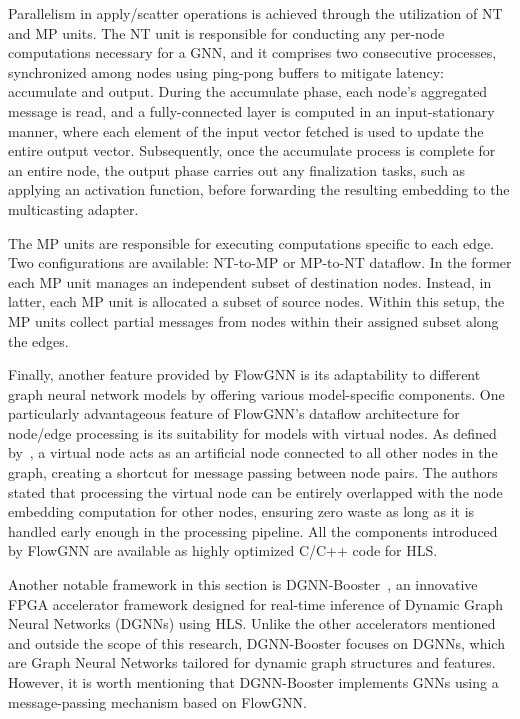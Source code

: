 Parallelism in apply/scatter operations is achieved through the utilization of NT and MP units.
The NT unit is responsible for conducting any per-node computations necessary for a GNN, and it comprises two consecutive processes, synchronized among nodes using ping-pong buffers to mitigate latency: accumulate and output.
During the accumulate phase, each node's aggregated message is read, and a fully-connected layer is computed in an input-stationary manner, where each element of the input vector fetched is used to update the entire output vector.
Subsequently, once the accumulate process is complete for an entire node, the output phase carries out any finalization tasks, such as applying an activation function, before forwarding the resulting embedding to the multicasting adapter.

The MP units are responsible for executing computations specific to each edge.
Two configurations are available: NT-to-MP or MP-to-NT dataflow.
In the former each MP unit manages an independent subset of destination nodes.
Instead, in latter, each MP unit is allocated a subset of source nodes.
Within this setup, the MP units collect partial messages from nodes within their assigned subset along the edges.

Finally, another feature provided by FlowGNN is its adaptability to different graph neural network models by offering various model-specific components.
One particularly advantageous feature of FlowGNN's dataflow architecture for node/edge processing is its suitability for models with virtual nodes.
As defined by~\cite{DBLP:journals/corr/GilmerSRVD17}, a virtual node acts as an artificial node connected to all other nodes in the graph, creating a shortcut for message passing between node pairs.
The authors stated that processing the virtual node can be entirely overlapped with the node embedding computation for other nodes, ensuring zero waste as long as it is handled early enough in the processing pipeline.
All the components introduced by FlowGNN are available as highly optimized C/C++ code for HLS.

Another notable framework in this section is DGNN-Booster~\cite{chen2023dgnnbooster}, an innovative FPGA accelerator framework designed for real-time inference of Dynamic Graph Neural Networks (DGNNs) using HLS\@.
Unlike the other accelerators mentioned and outside the scope of this research, DGNN-Booster focuses on DGNNs, which are Graph Neural Networks tailored for dynamic graph structures and features.
However, it is worth mentioning that DGNN-Booster implements GNNs using a message-passing mechanism based on FlowGNN\@.


